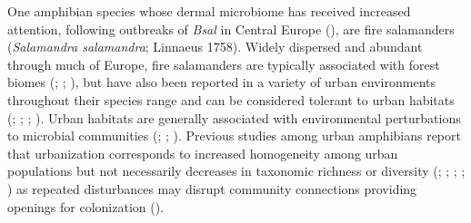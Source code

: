 \documentclass[
  12pt,
]{article}
\begin{document}
One amphibian species whose dermal microbiome has received increased
attention, following outbreaks of \emph{Bsal} in Central Europe
(), are fire salamanders (\emph{Salamandra salamandra}; Linnaeus
1758). Widely dispersed and abundant through much of Europe, fire
salamanders are typically associated with forest biomes
(;
;
), but have also
been reported in a variety of urban environments throughout their
species range and can be considered tolerant to urban habitats
(;
; ;
). Urban
habitats are generally associated with environmental perturbations to
microbial communities
(;
;
). Previous
studies among urban amphibians report that urbanization corresponds to
increased homogeneity among urban populations but not necessarily
decreases in taxonomic richness or diversity
(;
;
;
; ) as
repeated disturbances may disrupt community connections providing
openings for colonization ().
\end{document}

